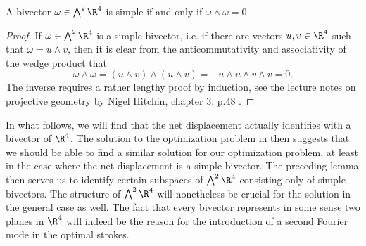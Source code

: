 \begin{lemma}
\label{lem:simple bivector}
A bivector $\omega \in \bigwedge^2 \R^4$ is simple if and only if $\omega \wedge \omega = 0$.
\end{lemma}

\begin{proof}
If $\omega \in \bigwedge^2 \R^4$ is a simple bivector, i.e. if there are vectors $u,v \in \R^4$ such that $\omega = u \wedge v$, then it is clear from the anticommutativity and associativity of the wedge product that
\begin{equation}
\omega \wedge \omega = (u \wedge v) \wedge (u \wedge v) = - u \wedge u \wedge v \wedge v = 0.
\end{equation}
The inverse requires a rather lengthy proof by induction, see the lecture notes on projective geometry by Nigel Hitchin, chapter 3, p.48 \cite{Hitchin2003}.
\end{proof}

In what follows, we will find that the net displacement actually identifies with a bivector of $\R^4$. The solution to the optimization problem in \cite{Alouges2017} then suggests that we should be able to find a similar solution for our optimization problem, at least in the case where the net displacement is a simple bivector. The preceding lemma then serves us to identify certain subspaces of $\bigwedge^2 \R^4$ consisting only of simple bivectors. The structure of $\bigwedge^2 \R^4$ will nonetheless be crucial for the solution in the general case as well. The fact that every bivector represents in some sense two planes in $\R^4$ will indeed be the reason for the introduction of a second Fourier mode in the optimal strokes.

